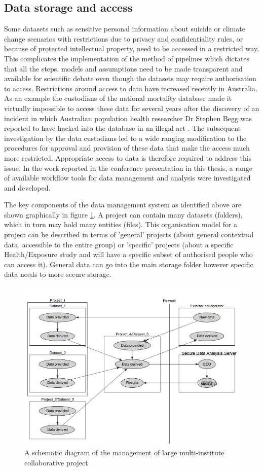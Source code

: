 \documentclass[11pt,a4paper]{article}
\begin{document}
\subsection{Data storage and access}\label{data-storage-and-access}

Some datasets such as sensitive personal information about suicide or
climate change scenarios with restrictions due to privacy and
confidentiality rules, or because of protected intellectual property,
need to be accessed in a restricted way. This complicates the
implementation of the method of pipelines which dictates that all the
steps, models and assumptions need to be made transparent and available
for scientific debate even though the datasets may require authorisation
to access. Restrictions around access to data have increased recently in
Australia. As an example the custodians of the national mortality
database made it virtually impossible to access these data for several
years after the discovery of an incident in which Australian population
health researcher Dr Stephen Begg was reported to have hacked into the
database in an illegal act \citep{OKeefe2007}. The subsequent investigation
by the data custodians led to a wide ranging modification to the
procedures for approval and provision of these data that make the access
much more restricted. Appropriate access to data is therefore required
to address this issue. In the work reported in the conference
presentation in this thesis, a range of available workflow tools for
data management and analysis were investigated and developed.

The key components of the  data management system as identified above are shown graphically in figure 
\ref{fig:file_name}.  A project can contain many datasets (folders), which in turn may hold many entities (files). This organisation model for a project can be described in terms of 'general' projects (about general contextual data, accessible to the entire group) or 'specific' projects (about a specific Health/Exposure study and will have a specific subset of authorised people who can access it).  General data can go into the main storage folder however specific data needs to more secure storage.

\begin{figure}[!h]
\centering
\includegraphics[width=.8\textwidth]{images/file_name.png}
\caption{A schematic diagram of the management of large multi-institute collaborative project}
\label{fig:file_name}
\end{figure}
\end{document}
